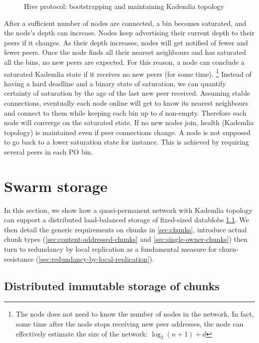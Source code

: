\begin{figure}[htbp]
   \centering
   \caption[Hive protocol: bootstrapping and maintaining Kademlia topology]{Hive protocol: bootstrapping and maintaining Kademlia topology}
   \label{fig:bootstrapping-kademlia}
\end{figure}

After a sufficient number of nodes are connected, a bin becomes saturated, and the node's depth can increase. Nodes keep advertising their current depth to their peers if it changes. As their  depth increases, nodes will get notified of fewer and fewer peers. Once the node finds all their nearest neighbours and has saturated all the bins, no new peers are expected. For this reason, a node can conclude  a saturated Kademlia state if it receives no new peers (for some time).%
%
\footnote{The node does not need to know the number of nodes in the network. In fact, some time after the node stops receiving new peer addresses, the node can effectively estimate the size of the network: $\log_2(n+1)+ d$}
%
Instead of having a hard deadline and a binary state of saturation, we can quantify certainty of saturation by the age of the last new peer received. Assuming stable connections, eventually each node online will get to know its nearest neighbours and connect to them while keeping each bin up to $d$ non-empty. Therefore each node will converge on the saturated state. If no new nodes join, health (Kademlia topology) is maintained even if peer connections change. A node is not supposed to go back to a lower saturation state for instance. This is achieved by requiring several peers in each PO bin. 

\section{Swarm storage}\label{sec:kademlia-storage}

In this section, we show how a quasi-permanent network with Kademlia topology can support a distributed load-balanced storage of fixed-sized datablobs \ref{sec:disc}.  We then detail the generic requirements on chunks in \ref{sec:chunks}, introduce actual  chunk types (\ref{sec:content-addressed-chunks} and \ref{sec:single-owner-chunks}) then turn to redundancy by local replication as a fundamental measure for churn-resistance (\ref{sec:redundancy-by-local-replication}).

\subsection{Distributed immutable storage of chunks}\label{sec:disc}
 
